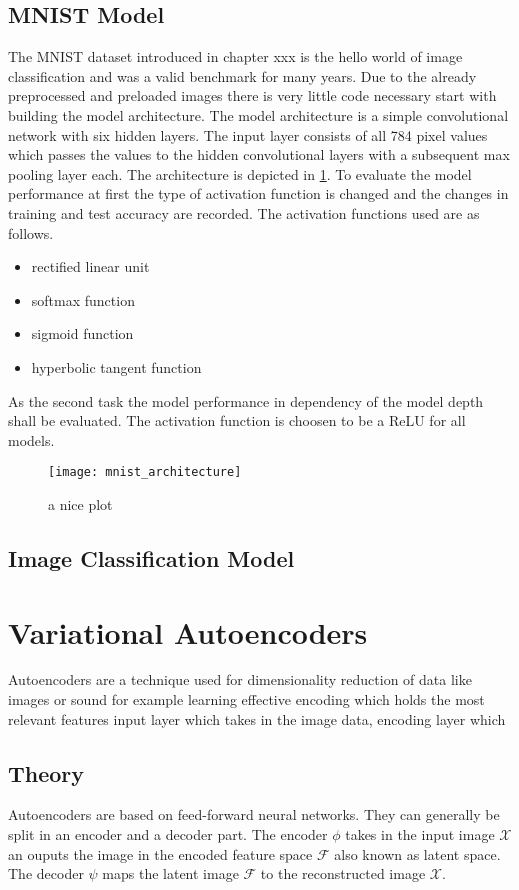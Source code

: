 \documentclass{scrreprt}
\begin{document}
\subsection{MNIST Model}
The MNIST dataset introduced in chapter xxx is the hello world of image classification and was a valid benchmark for many years. Due to the already preprocessed and preloaded images there is very little code necessary start with building the model architecture. The model architecture is a simple convolutional network with six hidden layers. The input layer consists of all 784 pixel values which passes the values to the hidden convolutional layers with a subsequent max pooling layer each. The architecture is depicted in \ref{fig:mnist_architecture}. To evaluate the model performance at first the type of activation function is changed and the changes in training and test accuracy are recorded. The activation functions used are as follows.

\begin{itemize}
\item rectified linear unit
\item softmax function
\item sigmoid function
\item hyperbolic tangent function
\end{itemize}

As the second task the model performance in dependency of the model depth shall be evaluated. The activation function is choosen to be a ReLU for all models.

\begin{figure}[h]
\centering
\texttt{[image: mnist\_architecture]}
\caption{a nice plot}
\label{fig:mnist_architecture}
\end{figure}




\subsection{Image Classification Model}

\section{Variational Autoencoders}
Autoencoders are a technique used for dimensionality reduction of data like images or sound for example
learning effective encoding which holds the most relevant features
input layer which takes in the image data, encoding layer which
\subsection{Theory}
Autoencoders are based on feed-forward neural networks. They can generally be split in an encoder and a decoder part. The encoder \(\phi\) takes in the input image \(\mathcal{X}\) an ouputs the image in the encoded feature space \(\mathcal{F}\) also known as latent space. The decoder \(\psi\) maps the latent image \(\mathcal{F}\) to the reconstructed image \(\mathcal{X}\).
\end{document}
